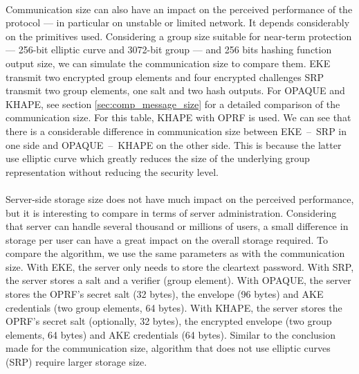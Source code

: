 ﻿\documentclass[../report.tex]{subfiles}
\begin{document}
\paragraph{}
Communication size can also have an impact on the perceived performance of the protocol --- in particular on unstable or limited network.
It depends considerably on the primitives used. Considering a group size suitable for near-term protection \cite{ECRYPT_Keylength} --- 256-bit elliptic curve and 3072-bit group --- and 256 bits hashing function output size, we can simulate the communication size to compare them.
EKE transmit two encrypted group elements and four encrypted challenges
SRP transmit two group elements, one salt and two hash outputs.
For OPAQUE and KHAPE, see section \ref{sec:comp_message_size} for a detailed comparison of the communication size. For this table, KHAPE with OPRF is used.
We can see that there is a considerable difference in communication size between EKE~--~SRP in one side and OPAQUE~--~KHAPE on the other side. This is because the latter use elliptic curve which greatly reduces the size of the underlying group representation without reducing the security level.
\paragraph{}
Server-side storage size does not have much impact on the perceived performance, but it is interesting to compare in terms of server administration. Considering that server can handle several thousand or millions of users, a small difference in storage per user can have a great impact on the overall storage required.
To compare the algorithm, we use the same parameters as with the communication size.
With EKE, the server only needs to store the cleartext password.
With SRP, the server stores a salt and a verifier (group element).
With OPAQUE, the server stores the OPRF's secret salt (32 bytes), the envelope (96 bytes) and AKE credentials (two group elements, 64 bytes).
With KHAPE, the server stores the OPRF's secret salt (optionally, 32 bytes), the encrypted envelope (two group elements, 64 bytes) and AKE credentials (64 bytes).
Similar to the conclusion made for the communication size, algorithm that does not use elliptic curves (SRP) require larger storage size.
\end{document}
